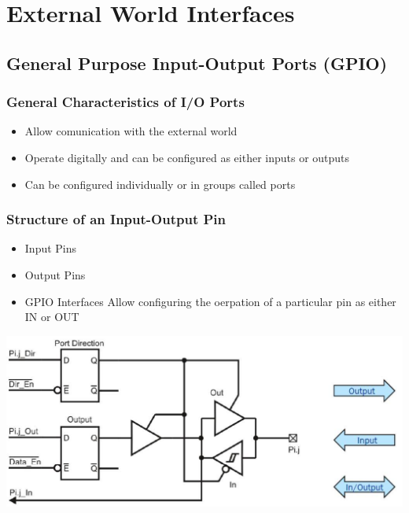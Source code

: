 
\section{External World Interfaces}
\subsection{General Purpose Input-Output Ports (GPIO)}
\subsubsection{General Characteristics of I/O Ports}
\begin{itemize}
    \item Allow comunication with the external world
    \item Operate digitally and can be configured as either inputs or outputs
    \item Can be configured individually or in groups called ports
\end{itemize}
\begin{multicols}{2}
    \subsubsection{Structure of an Input-Output Pin}
    \begin{itemize}
        \item Input Pins
        \item Output Pins
        \item GPIO Interfaces
        \subitem Allow configuring the oerpation of a particular pin as either IN or OUT  
    \end{itemize}
    
    \includegraphics[width=\linewidth]{images/IOStructure}  
\end{multicols}

